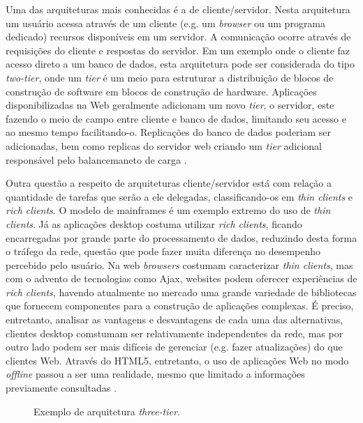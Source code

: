 \documentclass[diss]{template/setrem}
\begin{document}
Uma das arquiteturas mais conhecidas é a de cliente/servidor. Nesta arquitetura um usuário acessa através de um cliente (e.g. um \emph{browser} ou um programa dedicado) recursos disponíveis em um servidor. A comunicação ocorre através de requisições do cliente e respostas do servidor. Em um exemplo onde o cliente faz acesso direto a um banco de dados, esta arquitetura pode ser considerada do tipo \emph{two-tier}, onde um \emph{tier} é um meio para estruturar a distribuição de blocos de construção de software em blocos de construção de hardware. Aplicações disponibilizadas na Web geralmente adicionam um novo \emph{tier}, o servidor, este fazendo o meio de campo entre cliente e banco de dados, limitando seu acesso e ao mesmo tempo facilitando-o. Replicações do banco de dados poderiam ser adicionadas, bem como replicas do servidor web criando um \emph{tier} adicional responsável pelo balancemaneto de carga \citep{Vogel2011}.

Outra questão a respeito de arquiteturas cliente/servidor está com relação a quantidade de tarefas que serão a ele delegadas, classificando-os em \emph{thin clients} e \emph{rich clients}. O modelo de mainframes é um exemplo extremo do uso de \emph{thin clients}. Já as aplicações desktop costuma utilizar \emph{rich clients}, ficando encarregadas por grande parte do processamento de dados, reduzindo desta forma o tráfego da rede, questão que pode fazer muita diferença no desempenho percebido pelo usuário. Na web \emph{browsers} costumam caracterizar \emph{thin clients}, mas com o advento de tecnologias como Ajax, websites podem oferecer experiências de \emph{rich clients}, havendo atualmente no mercado uma grande variedade de bibliotecas que fornecem componentes para a construção de aplicações complexas. É preciso, entretanto, analisar as vantagens e desvantagens de cada uma das alternativas, clientes desktop comstumam ser relativamente independentes da rede, mas por outro lado podem ser mais difíceis de gerenciar (e.g. fazer atualizações) do que clientes Web. Através do HTML5, entretanto, o uso de aplicações Web no modo \emph{offline} passou a ser uma realidade, mesmo que limitado a informações previamente consultadas \citep{Vogel2011}.

\begin{figure}[!h]
    \caption{Exemplo de arquitetura \emph{three-tier}.}
    \label{fig:three-tier-arch}
\end{figure}
\end{document}
